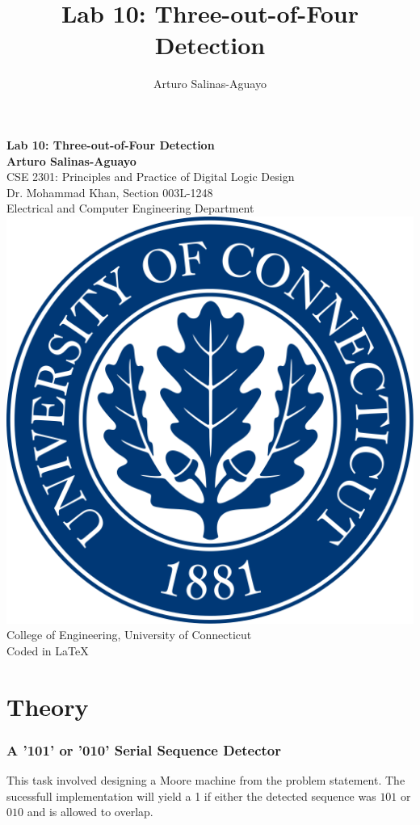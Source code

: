 \documentclass[12pt]{article}
\author{Arturo Salinas-Aguayo}
\title{Lab 10: Three-out-of-Four Detection}
\begin{document}
\newcommand{\closure}[2][3]{%
	{}\mkern#1mu\overline{\mkern-#1mu#2}}
\newcommand\ncoverline[1]{\mkern1mu\overline{\mkern-1mu#1\mkern-1mu}\mkern1mu}
\begin{titlepage}
	\centering
	\vspace*{3cm}
	\huge\textbf{Lab 10: Three-out-of-Four Detection}\\
	\vspace{5cm}
	\Large\textbf{Arturo Salinas-Aguayo}\\
	\normalsize
	CSE 2301: Principles and Practice of Digital Logic Design\\
	Dr. Mohammad Khan, Section 003L-1248\\
	Electrical and Computer Engineering Department
	\vfill
	\includegraphics[scale=0.1]{uconnlogo}\\
	College of Engineering, University of Connecticut\\
	\scriptsize{Coded in \LaTeX}
	\vspace*{1cm}
\end{titlepage}
\section*{Theory}
\subsubsection*{A '101' or '010' Serial Sequence Detector}
This task involved designing a Moore machine from the problem statement. The
sucessfull implementation will yield a 1 if either the detected sequence was
\(101\) or \(010\) and is allowed to overlap.
\end{document}
